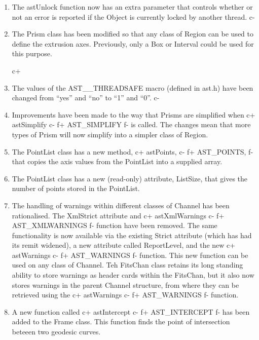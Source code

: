 \documentclass[twoside,11pt]{starlink}
\begin{document}
\begin{enumerate}

c+
\item The astUnlock function now has an extra parameter that controls whether
or not an error is reported if the Object is currently locked by another
thread.
c-

\item The Prism class has been modified so that any class of Region can
be used to define the extrusion axes. Previously, only a Box or Interval
could be used for this purpose.

c+
\item The values of the AST\_\_THREADSAFE macro (defined in ast.h) have
been changed from ``yes'' and ``no'' to ``1'' and ``0''.
c-

\item Improvements have been made to the way that Prisms are simplified
when
c+
astSimplify
c-
f+
AST\_SIMPLIFY
f-
is called.  The changes mean that more types of Prism will now simplify
into a simpler class of Region.

\item The PointList class has a new method,
c+
astPoints,
c-
f+
AST\_POINTS,
f-
that copies the axis values from the PointList into a supplied array.

\item The PointList class has a new (read-only) attribute, ListSize, that
gives the number of points stored in the PointList.

\item The handling of warnings within different classes of Channel has
been rationalised. The XmlStrict attribute and
c+
astXmlWarnings
c-
f+
AST\_XMLWARNINGS
f-
function have been removed. The same functionality is now available via
the existing Strict attribute (which has had its remit widened), a new
attribute called ReportLevel, and the new
c+
astWarnings
c-
f+
AST\_WARNINGS
f-
function. This new function can be used on any class of Channel. Teh
FitsChan class retains its long standing ability to store warnings as
header cards within the FitsChan, but it also now stores warnings in the
parent Channel structure, from where they can be retrieved using the
c+
astWarnings
c-
f+
AST\_WARNINGS
f-
function.

\item A new function called
c+
astIntercept
c-
f+
AST\_INTERCEPT
f-
has been added to the Frame class. This function finds the point of
intersection beteeen two geodesic curves.


\end{enumerate}
\end{document}

